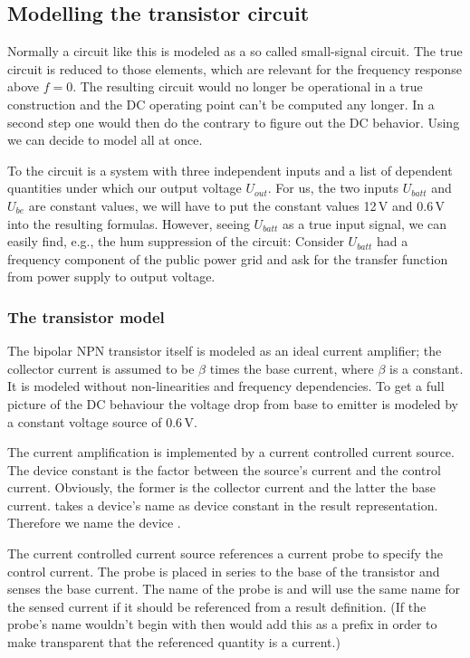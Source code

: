 \subsection{Modelling the transistor circuit}
 
Normally a circuit like this is modeled as a so called small-signal
circuit. The true circuit is reduced to those elements, which are relevant
for the frequency response above $f=0$. The resulting circuit would no
longer be operational in a true construction and the DC operating point
can't be computed any longer. In a second step one would then do the
contrary to figure out the DC behavior. Using \linnet{} we can decide to
model all at once.

To \linnet{} the circuit is a system with three independent inputs and a
list of dependent quantities under which our output voltage $U_{out}$. For
us, the two inputs $U_{batt}$ and $U_{be}$ are constant values, we will
have to put the constant values 12\,V and 0.6\,V into the resulting
formulas. However, seeing $U_{batt}$ as a true input signal, we can easily
find, e.g., the hum suppression of the circuit: Consider $U_{batt}$ had a
frequency component of the public power grid and ask for the transfer
function from power supply to output voltage.

\subsubsection{The transistor model}

The bipolar NPN transistor itself is modeled as an ideal current
amplifier; the collector current is assumed to be $\beta$ times the base
current, where $\beta$ is a constant. It is modeled without
non-linearities and frequency dependencies. To get a full picture of the
DC behaviour the voltage drop from base to emitter is modeled by a
constant voltage source of 0.6\,V.

The current amplification is implemented by a current controlled current
source. The device constant is the factor between the source's current and
the control current. Obviously, the former is the collector current and
the latter the base current. \linnet{} takes a device's name as device
constant in the result representation. Therefore we name the device
.

The current controlled current source references a current probe to
specify the control current. The probe is placed in series to the base of
the transistor and senses the base current. The name of the probe is
 and \linnet{} will use the same name for the sensed
current if it should be referenced from a result definition. (If the
probe's name wouldn't begin with  then \linnet{} would add this
as a prefix in order to make transparent that the referenced quantity is a
current.)


